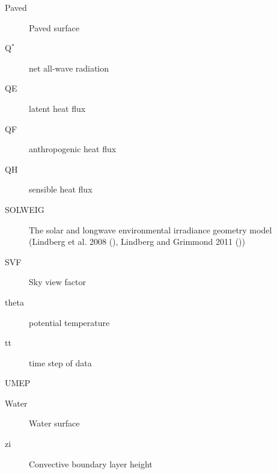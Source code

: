 \documentclass[letterpaper,10pt,english]{sphinxmanual}
\begin{document}
\begin{description}
\item[{Paved}] \leavevmode{}\label{\detokenize{notation:term-paved}}
Paved surface

\item[{Q$^{\text{*}}$}] \leavevmode{}\label{\detokenize{notation:term-qstar}}
net all-wave radiation

\item[{QE}] \leavevmode{}\label{\detokenize{notation:term-qe}}
latent heat flux

\item[{QF}] \leavevmode{}\label{\detokenize{notation:term-qf}}
anthropogenic  heat flux

\item[{QH}] \leavevmode{}\label{\detokenize{notation:term-qh}}
sensible heat  flux

\item[{SOLWEIG}] \leavevmode{}\label{\detokenize{notation:term-solweig}}
The solar and longwave environmental irradiance geometry model
(Lindberg et al. 2008 \label{\detokenize{notation:id8}}{\hyperref[\detokenize{references:fl2008}]{\sphinxcrossref{{[}FL2008{]}}}} (),   Lindberg and Grimmond 2011 \label{\detokenize{notation:id9}}{\hyperref[\detokenize{references:fl2011}]{\sphinxcrossref{{[}FL2011{]}}}} ())

\item[{SVF}] \leavevmode{}\label{\detokenize{notation:term-svf}}
Sky view factor

\item[{theta}] \leavevmode{}\label{\detokenize{notation:term-theta}}
potential  temperature

\item[{tt}] \leavevmode{}\label{\detokenize{notation:term-tt}}
time step of data

\item[{UMEP}] \leavevmode{}\label{\detokenize{notation:term-umep}}

\item[{Water}] \leavevmode{}\label{\detokenize{notation:term-water}}
Water surface

\item[{zi}] \leavevmode{}\label{\detokenize{notation:term-zi}}
Convective boundary layer height

\end{description}
\end{document}
